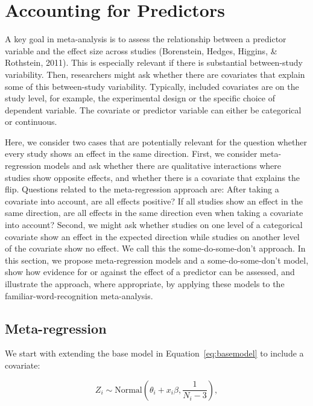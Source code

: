 \documentclass[english,,man]{apa6}
\begin{document}
\hypertarget{accounting-for-predictors}{%
\section{Accounting for Predictors}\label{accounting-for-predictors}}

A key goal in meta-analysis is to assess the relationship between a predictor variable and the effect size across studies (Borenstein, Hedges, Higgins, \& Rothstein, 2011). This is especially relevant if there is substantial between-study variability. Then, researchers might ask whether there are covariates that explain some of this between-study variability. Typically, included covariates are on the study level, for example, the experimental design or the specific choice of dependent variable. The covariate or predictor variable can either be categorical or continuous.

Here, we consider two cases that are potentially relevant for the question whether every study shows an effect in the same direction. First, we consider meta-regression models and ask whether there are qualitative interactions where studies show opposite effects, and whether there is a covariate that explains the flip. Questions related to the meta-regression approach are: After taking a covariate into account, are all effects positive? If all studies show an effect in the same direction, are all effects in the same direction even when taking a covariate into account? Second, we might ask whether studies on one level of a categorical covariate show an effect in the expected direction while studies on another level of the covariate show no effect. We call this the some-do-some-don't approach. In this section, we propose meta-regression models and a some-do-some-don't model, show how evidence for or against the effect of a predictor can be assessed, and illustrate the approach, where appropriate, by applying these models to the familiar-word-recognition meta-analysis.

\hypertarget{meta-regression}{%
\subsection{Meta-regression}\label{meta-regression}}

We start with extending the base model in Equation~\eqref{eq:basemodel} to include a covariate:

\begin{equation} \label{eq:pred}
Z_i \sim \mbox{Normal}(\theta_i + x_i \beta, \frac{1}{N_i - 3}),
\end{equation}
\end{document}
